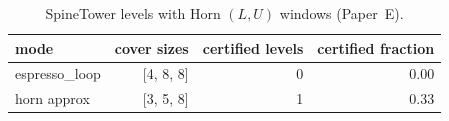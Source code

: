 \begin{table}[h]\centering\small
\caption{SpineTower levels with Horn $(L,U)$ windows (Paper~E).}
\label{tab:spine-horn}
\begin{tabular}{lrrr}\hline
mode & cover sizes & certified levels & certified fraction \\\hline
espresso\_loop & [4, 8, 8] & 0 & 0.00 \\
horn approx & [3, 5, 8] & 1 & 0.33 \\
\hline\end{tabular}\end{table}
